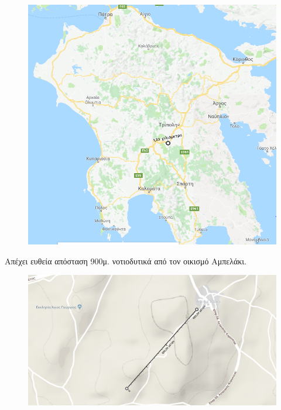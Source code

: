 \documentclass[12pt]{article}
\begin{document}
 	\begin{figure} [H]
 		\begin{center}
 			\includegraphics [scale = 0.50] {map30.png}
 		\end{center}
 	\end{figure}
 
 	Απέχει ευθεία απόσταση 900μ. νοτιοδυτικά από τον οικισμό Αμπελάκι.
 	
 	\begin{figure} [H]
 		\begin{center}
 			\includegraphics [scale = 0.40] {map31.png}
 		\end{center}
 	\end{figure}
 
\end{document}
